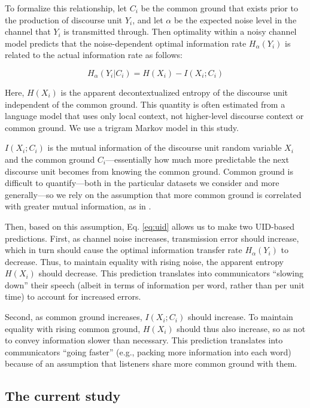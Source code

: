 \documentclass[11pt,letterpaper]{article}
\begin{document}
To formalize this relationship, let $C_i$ be the common ground that exists prior to the production of discourse unit $Y_i$, and let $\alpha$ be the expected noise level in the channel that $Y_i$ is transmitted through.  Then optimality within a noisy channel model predicts that the noise-dependent optimal information rate $H_{\alpha}(Y_i)$ is related to the actual information rate as follows:

\begin{equation}
H_{\alpha}(Y_i|C_i) =  H(X_i) - I(X_i ; C_i) \label{eq:uid}
\end{equation}

Here, $H(X_i)$ is the apparent decontextualized entropy of the discourse unit independent of the common ground.  This quantity is often estimated from a language model that uses only local context, not higher-level discourse context or common ground.  We use a trigram Markov model in this study.

$I(X_i;C_i)$ is the mutual information of the discourse unit random variable $X_i$ and the common ground $C_i$---essentially how much more predictable the next discourse unit becomes from knowing the common ground.  Common ground is difficult to quantify---both in the particular datasets we consider and more generally---so we rely on the assumption that more common ground is correlated with greater mutual information, as in .

Then, based on this assumption, Eq. \ref{eq:uid} allows us to make two UID-based predictions. First, as channel noise increases, transmission error should increase, which in turn should cause the optimal information transfer rate $H_\alpha(Y_i)$ to decrease.  Thus, to maintain equality with rising noise, the apparent entropy $H(X_i)$ should decrease. This prediction translates into communicators ``slowing down'' their speech (albeit in terms of information per word, rather than per unit time) to account for increased errors. 

Second, as common ground increases, $I(X_i;C_i)$ should increase. To maintain equality with rising common ground, $H(X_i)$ should thus also increase, so as not to convey information slower than necessary. This prediction translates into communicators ``going faster'' (e.g., packing more information into each word) because of an assumption that listeners share more common ground with them.

\subsection{The current study}
\end{document}

